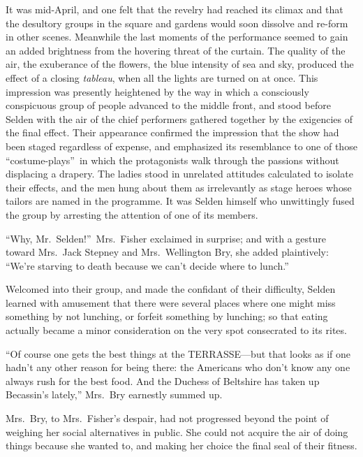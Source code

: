 \documentclass[12pt,a4paper]{book}
\begin{document}
It was mid-April, and one felt that the revelry had reached its
climax and that the desultory groups in the square and gardens
would soon dissolve and re-form in other scenes. Meanwhile the
last moments of the performance seemed to gain an added
brightness from the hovering threat of the curtain. The quality
of the air, the exuberance of the flowers, the blue intensity of
sea and sky, produced the effect of a closing \textit{tableau}, when all
the lights are turned on at once. This impression was presently
heightened by the way in which a consciously conspicuous group of
people advanced to the middle front, and stood before Selden with
the air of the chief performers gathered together by the
exigencies of the final effect. Their appearance confirmed the
impression that the show had been staged regardless of expense,
and emphasized its resemblance to one of those ``costume-plays''\ in
which the protagonists walk through the passions without
displacing a drapery. The ladies stood in unrelated attitudes
calculated to isolate their effects, and the men hung about them
as irrelevantly as stage heroes whose tailors are named in the
programme. It was Selden himself who unwittingly fused the group
by arresting the attention of one of its members.





``Why, Mr.\ Selden!''\ Mrs.\ Fisher exclaimed in surprise; and with a
gesture toward Mrs.\ Jack Stepney and Mrs.\ Wellington Bry, she
added plaintively: ``We're starving to death because we can't
decide where to lunch.''





Welcomed into their group, and made the confidant of their
difficulty, Selden learned with amusement that there were several
places where one might miss something by not lunching, or forfeit
something by lunching; so that eating actually became a minor
consideration on the very spot consecrated to its rites.





``Of course one gets the best things at the TERRASSE---but that
looks as if one hadn't any other reason for being there: the
Americans who don't know any one always rush for the best food. 
And the Duchess of Beltshire has taken up Becassin's lately,''
Mrs.\ Bry earnestly summed up.





Mrs.\ Bry, to Mrs.\ Fisher's despair, had not progressed beyond the
point of weighing her social alternatives in public. She could
not acquire the air of doing things because she wanted to, and
making her choice the final seal of their fitness.
\end{document}
